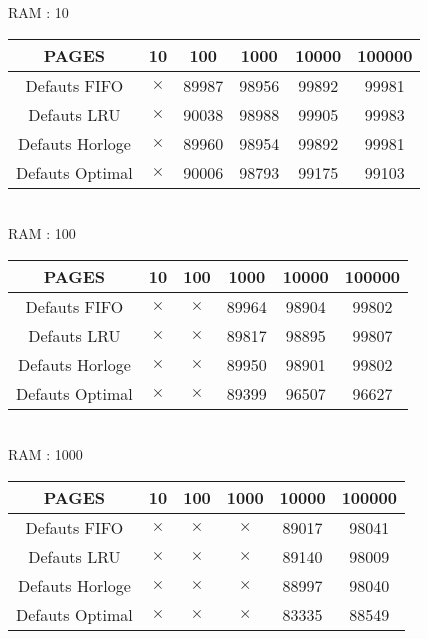 \documentclass[a4paper, 10pt]{article}
\begin{document}
    RAM : 10 \\
    \begin{tabular}{|c|c|c|c|c|c|}
      \hline
        PAGES             & 10 & 100 & 1000 & 10000 & 100000 \\
      \hline
        Defauts FIFO    & $\times$ & 89987 & 98956 & 99892 & 99981 \\
      \hline
        Defauts LRU     & $\times$ & 90038 & 98988 & 99905 & 99983 \\
      \hline
        Defauts Horloge & $\times$ & 89960 & 98954 & 99892 & 99981\\
      \hline
        Defauts Optimal & $\times$ & 90006 & 98793 & 99175 & 99103 \\
      \hline
    \end{tabular} \\

    RAM : 100 \\
    \begin{tabular}{|c|c|c|c|c|c|}
      \hline
        PAGES             & 10 & 100 & 1000 & 10000 & 100000 \\
      \hline
        Defauts FIFO & $\times$ & $\times$ & 89964 & 98904 & 99802 \\
      \hline
        Defauts LRU & $\times$ & $\times$ & 89817 & 98895 & 99807 \\
      \hline
        Defauts Horloge & $\times$ & $\times$ & 89950 & 98901 & 99802 \\
      \hline
        Defauts Optimal & $\times$ & $\times$ & 89399 & 96507 & 96627 \\
      \hline
    \end{tabular} \\

    RAM : 1000 \\
    \begin{tabular}{|c|c|c|c|c|c|}
      \hline
        PAGES             & 10 & 100 & 1000 & 10000 & 100000 \\
      \hline
        Defauts FIFO & $\times$ & $\times$ & $\times$ & 89017 & 98041 \\
      \hline
        Defauts LRU & $\times$ & $\times$ & $\times$ & 89140 & 98009 \\
      \hline
        Defauts Horloge & $\times$ & $\times$ & $\times$ & 88997 & 98040 \\
      \hline
        Defauts Optimal & $\times$ & $\times$ & $\times$ & 83335 & 88549 \\
      \hline
    \end{tabular} \\
\end{document}
